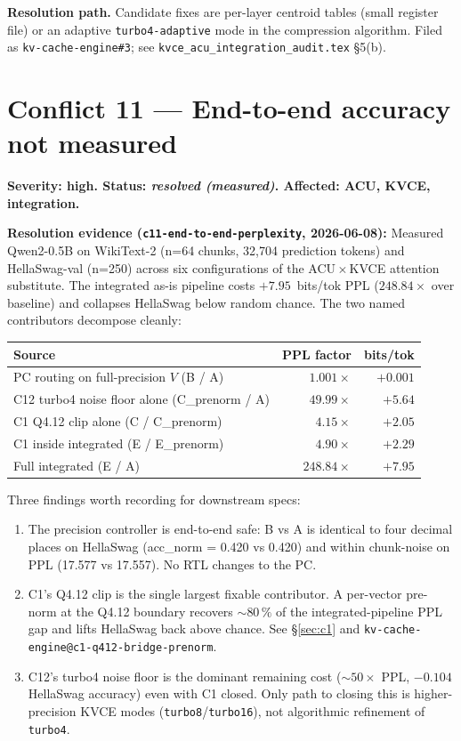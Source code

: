 \documentclass[11pt]{article}
\begin{document}
\textbf{Resolution path.} Candidate fixes are per-layer centroid
tables (small register file) or an adaptive
\texttt{turbo4-adaptive} mode in the compression algorithm. Filed
as \texttt{kv-cache-engine\#3}; see
\texttt{kvce\_acu\_integration\_audit.tex} \S5(b).

\section{Conflict 11 --- End-to-end accuracy not measured}
\label{sec:c11}

\textbf{Severity: high. Status: \textit{resolved (measured)}. Affected: ACU, KVCE, integration.}

\textbf{Resolution evidence (\texttt{c11-end-to-end-perplexity}, 2026-06-08):}
Measured Qwen2-0.5B on WikiText-2 (n=64 chunks, 32{,}704 prediction
tokens) and HellaSwag-val (n=250) across six configurations of the
ACU\,$\times$\,KVCE attention substitute. The integrated as-is
pipeline costs $+7.95$~bits/tok PPL ($248.84\times$ over baseline) and
collapses HellaSwag below random chance. The two named contributors
decompose cleanly:

\begin{center}
\begin{tabular}{@{}lrr@{}}
\toprule
\textbf{Source} & \textbf{PPL factor} & \textbf{bits/tok} \\
\midrule
PC routing on full-precision $V$ (B / A)         & $1.001\times$   & $+0.001$ \\
C12 turbo4 noise floor alone (C\_prenorm / A)    & $49.99\times$   & $+5.64$  \\
C1 Q4.12 clip alone (C / C\_prenorm)             & $4.15\times$    & $+2.05$  \\
C1 inside integrated (E / E\_prenorm)            & $4.90\times$    & $+2.29$  \\
Full integrated (E / A)                          & $248.84\times$  & $+7.95$  \\
\bottomrule
\end{tabular}
\end{center}

Three findings worth recording for downstream specs:

\begin{enumerate}
\item The precision controller is end-to-end safe: B vs A is identical
to four decimal places on HellaSwag (acc\_norm = 0.420 vs 0.420) and
within chunk-noise on PPL (17.577 vs 17.557). No RTL changes to the
PC.
\item C1's Q4.12 clip is the single largest fixable contributor. A
per-vector pre-norm at the Q4.12 boundary recovers $\sim 80\,\%$ of
the integrated-pipeline PPL gap and lifts HellaSwag back above chance.
See \S\ref{sec:c1} and \texttt{kv-cache-engine@c1-q412-bridge-prenorm}.
\item C12's turbo4 noise floor is the dominant remaining cost ($\sim 50\times$
PPL, $-0.104$ HellaSwag accuracy) even with C1 closed. Only path to
closing this is higher-precision KVCE modes
(\texttt{turbo8}/\texttt{turbo16}), not algorithmic refinement of
\texttt{turbo4}.
\end{enumerate}
\end{document}
